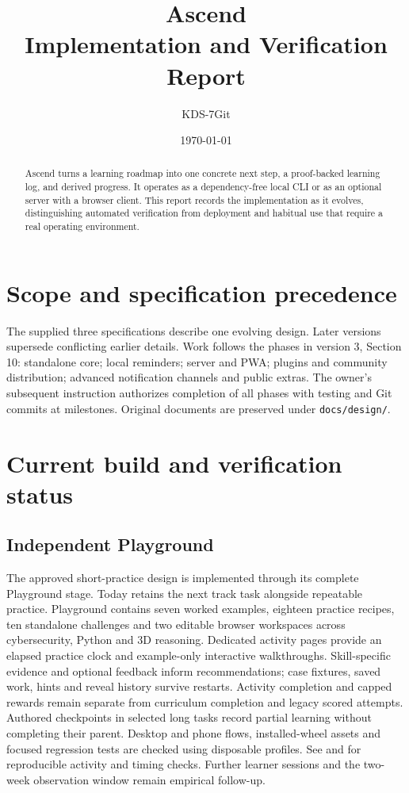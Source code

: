 \documentclass[11pt,a4paper]{article}
\title{Ascend\\\large Implementation and Verification Report}
\author{KDS-7Git}
\date{\today}
\begin{document}
\maketitle
\begin{abstract}
Ascend turns a learning roadmap into one concrete next step, a proof-backed
learning log, and derived progress. It operates as a dependency-free local CLI or
as an optional server with a browser client. This report records the implementation
as it evolves, distinguishing automated verification from deployment and habitual
use that require a real operating environment.
\end{abstract}
\tableofcontents
\newpage
\section{Scope and specification precedence}
The supplied three specifications describe one evolving design. Later versions
supersede conflicting earlier details. Work follows the phases in version 3,
Section 10: standalone core; local reminders; server and PWA; plugins and community
distribution; advanced notification channels and public extras. The owner's
subsequent instruction authorizes completion of all phases with testing and Git
commits at milestones. Original documents are preserved under \texttt{docs/design/}.

\section{Current build and verification status}



\subsection{Independent Playground}
The approved short-practice design is implemented through its complete Playground
stage. Today retains the next track task alongside repeatable practice. Playground
contains seven worked examples, eighteen practice recipes, ten standalone challenges
and two editable browser workspaces across cybersecurity, Python and 3D reasoning.
Dedicated activity pages provide an elapsed practice clock and example-only
interactive walkthroughs. Skill-specific evidence and optional feedback inform recommendations;
case fixtures, saved work, hints and reveal history survive restarts. Activity
completion and capped rewards remain separate from curriculum completion and
legacy scored attempts. Authored checkpoints in selected long tasks record partial
learning without completing their parent. Desktop and phone flows, installed-wheel
assets and focused regression tests are checked using disposable profiles. See
 and 
for reproducible activity and timing checks. Further
learner sessions and the two-week observation window remain empirical follow-up.
\end{document}
